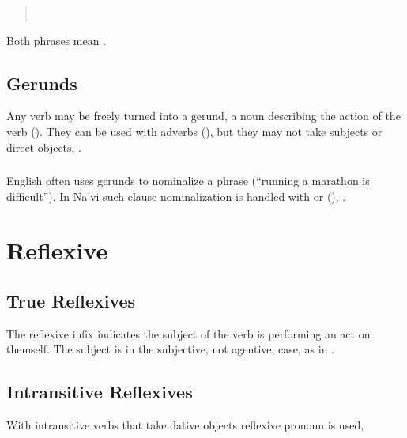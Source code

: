 \begin{quotation}
\noindent{}\\
\noindent{}
\end{quotation}

\noindent Both phrases mean .

\subsection{Gerunds} Any verb may be freely turned into a gerund, a
noun describing the action of the verb ().
They can be used with adverbs (),
but they may not take subjects or direct objects,  .\label{syn:gerund}

\subsubsection{} English often uses gerunds to nominalize a phrase
(``running a mara\-thon is difficult'').  In Na'vi such clause
nominalization is handled with  or  
(), 
.


\section{Reflexive}
\subsection{True Reflexives} The reflexive infix 
indicates the subject of the verb is performing an act on themself.
The subject is in the subjective, not agentive, case, as in  .

\subsection{Intransitive Reflexives} With intransitive verbs that take
dative objects reflexive pronoun  is used,

